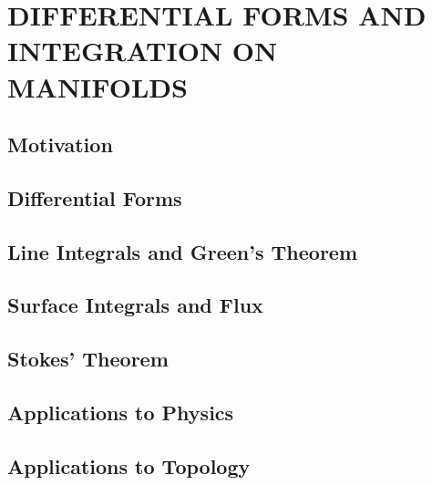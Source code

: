 \section{DIFFERENTIAL FORMS AND INTEGRATION ON MANIFOLDS}
\subsection{Motivation}
\subsection{Differential Forms}
\subsection{Line Integrals and Green's Theorem}
\subsection{Surface Integrals and Flux}
\subsection{Stokes' Theorem}
\subsection{Applications to Physics}
\subsection{Applications to Topology}